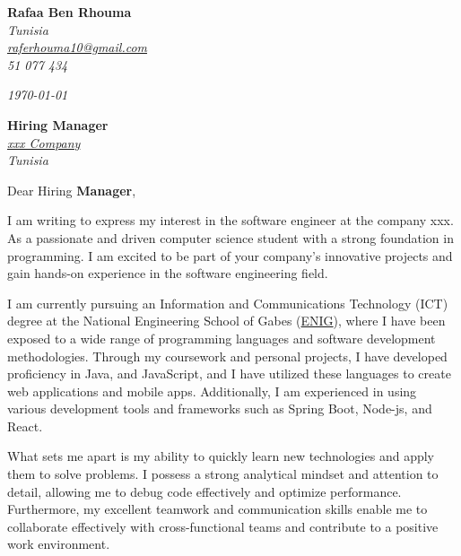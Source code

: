 \documentclass[12pt]{article}
\begin{document}
\begin{flushleft}
\textbf{Rafaa Ben Rhouma} \\
\textit{\small Tunisia} \\
\href{mailto:raferhouma10@gmail.com}{\textit{\small\color{blue}raferhouma10@gmail.com}} \\
\textit{\small 51 077 434} \\
\end{flushleft}

\begin{flushright}
\textit{\small\today} \\
\end{flushright}

\bigskip

\begin{flushleft}
\textbf{Hiring Manager} \\
\href{https://www.oracle.com/}{\textit{\small\color{blue} xxx Company}} \\
\textit{\small Tunisia} \\
\end{flushleft}

\bigskip

Dear Hiring \textbf{Manager},

\vspace{6pt}

I am writing to express my interest in the software engineer at the company xxx. As a passionate and driven computer science student with a strong foundation in programming. I am excited to be part of your company's innovative projects and gain hands-on experience in the software engineering field.

\vspace{6pt}

I am currently pursuing an Information and Communications Technology (ICT) degree at the National Engineering School of Gabes (\href{https://enig.rnu.tn/}{\color{blue}ENIG}), where I have been exposed to a wide range of programming languages and software development methodologies. Through my coursework and personal projects, I have developed proficiency in Java, and JavaScript, and I have utilized these languages to create web applications and mobile apps. Additionally, I am experienced in using various development tools and frameworks such as Spring Boot, Node-js, and React.

\vspace{6pt}

What sets me apart is my ability to quickly learn new technologies and apply them to solve problems. I possess a strong analytical mindset and attention to detail, allowing me to debug code effectively and optimize performance. Furthermore, my excellent teamwork and communication skills enable me to collaborate effectively with cross-functional teams and contribute to a positive work environment.
\end{document}

